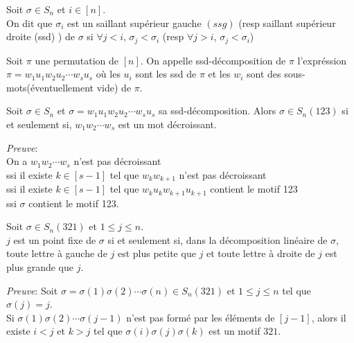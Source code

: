 \begin{definition}
	\begin{rm}
		Soit $\sigma\in S_{n}$ et  $i\in [n]$.\\
		On dit que $\sigma_{i}$ est un saillant supérieur gauche $(ssg)$ (resp saillant
		supérieur droite (ssd) )  de $\sigma$ si $\forall j<i\text{, }\sigma_{j}<\sigma_{i}$
		(resp $\forall j>i$, $\sigma_{j}<\sigma_{i}$)
	\end{rm}
\end{definition}

\begin{definition}
	\begin{rm}
		Soit $\pi$ une permutation de $[n]$. On appelle ssd-décomposition de $\pi$ l'expréssion $\pi = w_{1}u_{1}w_{2}u_2 \cdots w_{s}u_{s}$ où les $u_{i}$ sont les ssd de $\pi$ et les $w_{i}$ sont des sous-mots(éventuellement vide)  de $\pi$.
	\end{rm}
\end{definition}
\begin{lemme}
	Soit $\sigma \in S_{n}$ et $\sigma = w_{1}u_{1}w_{2}u_2 \cdots w_{s}u_{s}$ sa ssd-décomposition. Alors $\sigma \in S_{n}(123)$ si et seulement si, $w_{1}w_{2}\cdots w_{s}$ est un mot décroissant.
\end{lemme}
\textit{Preuve}:\\
On a $w_{1}w_{2}\cdots w_{s}$  n'est pas décroissant\\
ssi il existe $k \in [s - 1]$ tel que $w_{k} w_{k+1}$ n'est pas décroissant\\
ssi il existe $k \in [s - 1]$ tel que $w_{k} u_{k} w_{k+1} u_{k+1}$ contient le motif 123\\
ssi $\sigma$ contient le motif 123.
\begin{lemme} \label{jPtFix}
	Soit $\sigma \in S_{n}(321)$ et $1\leq j \leq n$.\\ $j$ est un point fixe de $\sigma$ si et seulement si, dans la décomposition linéaire de $\sigma$, toute lettre à gauche de $j$ est plus petite que $j$ et toute lettre à droite de $j$ est plus grande que $j$.
\end{lemme}
\textit{Preuve}:
Soit $\sigma = \sigma(1)\sigma(2)\cdots \sigma(n) \in S_{n}(321)$ et $1\leq j \leq n$ tel que $\sigma(j)=j$.\\
Si $\sigma(1)\sigma(2)\cdots \sigma(j-1)$ n'est pas formé par les éléments de $[j-1]$, alors il existe $i<j$ et $k>j$ tel que $\sigma(i)\sigma(j)\sigma(k)$ est un motif $321$.


